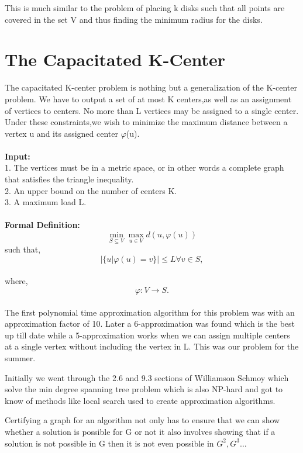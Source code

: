 \documentclass[12pt,a4paper,onecolumn]{article}
\begin{document}
This is much similar to the problem of placing k disks such that all points are covered in the set V and thus finding the minimum radius for the disks.

\section{The Capacitated K-Center}
The capacitated K-center problem is nothing but a generalization of the K-center problem. We have to
output a set of at most K centers,as well as an assignment of vertices to centers. No more than L vertices may be assigned to a single center. Under these constraints,we
wish to minimize the maximum distance between a vertex u and its assigned center
$\varphi$(u). \\\\
\textbf{Input:}\\1. The vertices must be in a metric space, or in other words a complete graph that satisfies the triangle inequality.\\2. An
upper bound on the number of centers K.\\3. A maximum load L.\\\\
\textbf{Formal Definition:}\\
$$ \min_{S \subseteq V}\max_{u \in V}d(u,\varphi(u)) $$such that,   $$|\{u|\varphi(u) = v\}|\leq L \forall v \in S,$$\\where,   $$\varphi : V \rightarrow S.$$\\
The first polynomial time approximation
algorithm for this problem was with an approximation factor of 10. Later a 6-approximation was found which is the best up till date while a 5-approximation works when we can assign multiple centers at a single vertex without including the vertex in L. This was our problem for the summer.

Initially we went through the 2.6 and 9.3 sections of Williamson Schmoy which solve the min degree spanning tree problem which is also NP-hard and got to know of methods like local search used to create approximation algorithms.

Certifying a graph for an algorithm not only has to ensure that we can show whether a solution is possible for G or not it also involves showing that if a solution is not possible in G then it is not even possible in $G^2,G^3\ldots$
\end{document}
